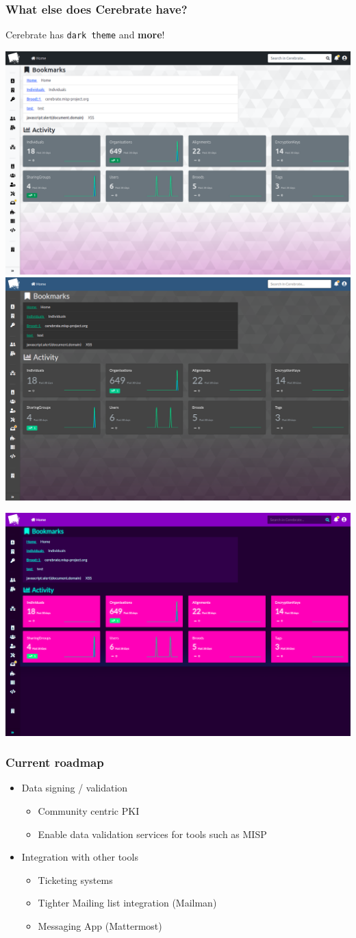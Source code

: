 \begin{frame}
\frametitle{What else does Cerebrate have?}
    Cerebrate has \colorbox{black!90}{\color{white}\texttt{dark theme}} and \textbf{{\color{blue!70}m}{\color{red!70}o}{\color{purple!90}r}{\color{orange!70}e}}!
    \linebreak
    \begin{center}
        \includegraphics[width=0.42\linewidth]{pictures/theme-1.png}
        \includegraphics[width=0.42\linewidth]{pictures/theme-2.png}
    \end{center}
    \begin{center}
        \includegraphics[width=0.42\linewidth]{pictures/theme-3.png}
    \end{center}
\end{frame}

\begin{frame}
\frametitle{Current roadmap}
    \begin{itemize}
        \item Data signing / validation
        \begin{itemize}
            \item Community centric PKI
            \item Enable data validation services for tools such as MISP
        \end{itemize}
        \item Integration with other tools
        \begin{itemize}
            \item Ticketing systems
            \item Tighter Mailing list integration (Mailman)
            \item Messaging App (Mattermost)
        \end{itemize}
    \end{itemize}
\end{frame}
